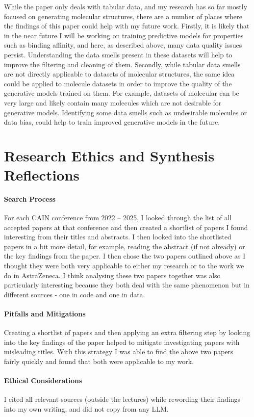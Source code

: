 \documentclass{article}
\begin{document}
While the paper only deals with tabular data, and my research has so far mostly focused on generating molecular structures, there are a number of places where the findings of this paper could help with my future work. Firstly, it is likely that in the near future I will be working on training predictive models for properties such as binding affinity, and here, as described above, many data quality issues persist. Understanding the data smells present in these datasets will help to improve the filtering and cleaning of them. Secondly, while tabular data smells are not directly applicable to datasets of molecular structures, the same idea could be applied to molecule datasets in order to improve the quality of the generative models trained on them. For example, datasets of molecular can be very large and likely contain many molecules which are not desirable for generative models. Identifying some data smells such as undesirable molecules or data bias, could help to train improved generative models in the future.


\section{Research Ethics and Synthesis Reflections}

\paragraph{Search Process}

For each CAIN conference from 2022 -- 2025, I looked through the list of all accepted papers at that conference and then created a shortlist of papers I found interesting from their titles and abstracts. I then looked into the shortlisted papers in a bit more detail, for example, reading the abstract (if not already) or the key findings from the paper. I then chose the two papers outlined above as I thought they were both very applicable to either my research or to the work we do in AstraZeneca. I think analysing these two papers together was also particularly interesting because they both deal with the same phenomenon but in different sources - one in code and one in data.


\paragraph{Pitfalls and Mitigations}

Creating a shortlist of papers and then applying an extra filtering step by looking into the key findings of the paper helped to mitigate investigating papers with misleading titles. With this strategy I was able to find the above two papers fairly quickly and found that both were applicable to my work.


\paragraph{Ethical Considerations}

I cited all relevant sources (outside the lectures) while rewording their findings into my own writing, and did not copy from any LLM.





\end{document}
